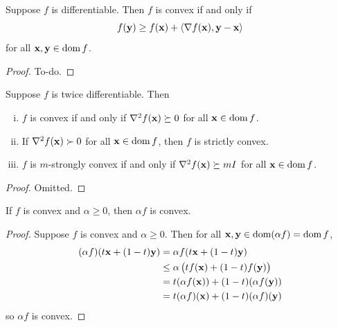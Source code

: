 \begin{proposition}
Suppose $f$ is differentiable. Then $f$ is convex if and only if
\[f(\mathbf{y}) \geq f(\mathbf{x}) + \langle \nabla f(\mathbf{x}), \mathbf{y} - \mathbf{x} \rangle\]
for all $\mathbf{x}, \mathbf{y} \in \operatorname*{dom} f$.
\end{proposition}
\begin{proof}
To-do.
\end{proof}

\begin{proposition}
Suppose $f$ is twice differentiable.
Then
\begin{enumerate}[(i)]
\item $f$ is convex if and only if $\nabla^2 f(\mathbf{x}) \succeq 0$ for all $\mathbf{x} \in \operatorname*{dom} f$.
\item If $\nabla^2 f(\mathbf{x}) \succ 0$ for all $\mathbf{x} \in \operatorname*{dom} f$, then $f$ is strictly convex.
\item $f$ is $m$-strongly convex if and only if $\nabla^2 f(\mathbf{x}) \succeq mI$ for all $\mathbf{x} \in \operatorname*{dom} f$.
\end{enumerate}
\end{proposition}
\begin{proof}
Omitted.
\end{proof}

\begin{proposition}
If $f$ is convex and $\alpha \geq 0$, then $\alpha f$ is convex.
\end{proposition}
\begin{proof}
Suppose $f$ is convex and $\alpha \geq 0$. Then for all $\mathbf{x}, \mathbf{y} \in \operatorname*{dom}(\alpha f) = \operatorname*{dom} f$,
\begin{align*}
(\alpha f)(t\mathbf{x} + (1-t)\mathbf{y}) &= \alpha f(t\mathbf{x} + (1-t)\mathbf{y}) \\
&\leq \alpha\left(tf(\mathbf{x}) + (1-t)f(\mathbf{y})\right) \\
&= t(\alpha f(\mathbf{x})) + (1-t)(\alpha f(\mathbf{y})) \\
&= t(\alpha f)(\mathbf{x}) + (1-t)(\alpha f)(\mathbf{y})
\end{align*}
so $\alpha f$ is convex.
\end{proof}

